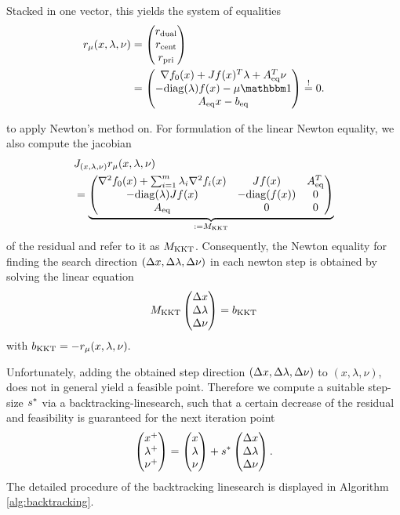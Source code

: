 Stacked in one vector, this yields the system of equalities
\begin{align}
\begin{split}
\label{eq:KKTres}
	 \rmu &= \vectorthree{\rdual}{\rcent}{\rpri} \\&= \vectorthree{\grad \fnull(x) + \jac \fx \trp \lambda + \Aeq \trp \nu}{-\diag(\lambda)\fx - \mu \ones}{\Aeq x - \beq} \overset{!}{=} 0.
\end{split}
\end{align}

to apply Newton's method on. For formulation of the linear Newton equality, we also compute  the jacobian
\begin{align}
	&J_{(x,\lambda,\nu)} r_\mu (x,\lambda,\nu)\\ &= 
	\underbrace{\begin{pmatrix}
		\nabla^2 f_0(x) + \sum_{i = 1}^{m} \lambda_i \nabla^2 f_i (x) & J f(x) & {A}_{\mathrm{eq}} ^T\\
		-\mathrm{diag}(\lambda) J f(x) & -\mathrm{diag}(f(x)) & 0\\
		{A}_{\mathrm{eq}} & 0 & 0
		\end{pmatrix}}_{:= {M}_{\mathrm{KKT}}}	
\end{align}
of the residual and refer to it as $ {M}_{\mathrm{KKT}} $. 
Consequently, the Newton equality for finding the search direction $ (\Delta x, \Delta \lambda,\Delta \nu) $ in each newton step is obtained by solving the linear equation
\begin{align}
\label{eq:rmuNewtonEq}
{M}_{\mathrm{KKT}}
	 \begin{pmatrix} {\Delta x} \\ {\Delta \lambda} \\ {\Delta \nu} \end{pmatrix} = {b}_{\mathrm{KKT}}
\end{align}
with $ {b}_{\mathrm{KKT}} = - r_\mu (x,\lambda,\nu). $

Unfortunately, adding the obtained step direction $ (\Delta x, \Delta \lambda,\Delta \nu) $ to $ (x,\lambda,\nu) $, does not in general yield a feasible point. Therefore we compute a suitable step-size $ s^* $ via a backtracking-linesearch, such that a certain decrease of the residual and feasibility is guaranteed for the next iteration point \[ \begin{pmatrix} {x^+} \\ {\lambda^+} \\ {\nu^+} \end{pmatrix} = \begin{pmatrix} {x} \\ {\lambda} \\ {\nu } \end{pmatrix} + s^*  \begin{pmatrix} {\Delta x} \\ {\Delta  \lambda} \\ {\Delta \nu} \end{pmatrix}.\]
The detailed procedure of the backtracking linesearch is displayed in Algorithm \ref{alg:backtracking}.

